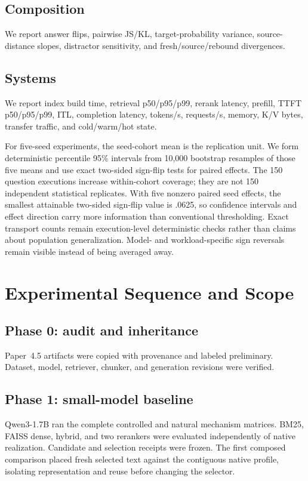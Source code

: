 \documentclass[11pt]{article}
\begin{document}
\subsection{Composition}
We report answer flips, pairwise JS/KL, target-probability variance, source-distance slopes, distractor sensitivity, and fresh/source/rebound divergences.

\subsection{Systems}
We report index build time, retrieval p50/p95/p99, rerank latency, prefill, TTFT p50/p95/p99, ITL, completion latency, tokens/s, requests/s, memory, K/V bytes, transfer traffic, and cold/warm/hot state.

For five-seed experiments, the seed-cohort mean is the replication unit. We
form deterministic percentile 95\% intervals from 10,000 bootstrap resamples
of those five means and use exact two-sided sign-flip tests for paired effects.
The 150 question executions increase within-cohort coverage; they are not 150
independent statistical replicates. With five nonzero paired seed effects, the
smallest attainable two-sided sign-flip value is .0625, so confidence intervals
and effect direction carry more information than conventional thresholding.
Exact transport counts remain execution-level deterministic checks rather than
claims about population generalization. Model- and workload-specific sign
reversals remain visible instead of being averaged away.

\section{Experimental Sequence and Scope}

\subsection{Phase 0: audit and inheritance}
Paper~4.5 artifacts were copied with provenance and labeled preliminary.
Dataset, model, retriever, chunker, and generation revisions were verified.

\subsection{Phase 1: small-model baseline}
Qwen3-1.7B ran the complete controlled and natural mechanism matrices. BM25,
FAISS dense, hybrid, and two rerankers were evaluated independently of native
realization. Candidate and selection receipts were frozen. The first composed
comparison placed fresh selected text against the contiguous native profile,
isolating representation and reuse before changing the selector.
\end{document}
